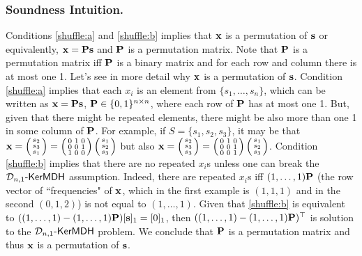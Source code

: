 \subsubsection{Soundness Intuition.} Conditions \ref{shuffle:a} and \ref{shuffle:b} implies that $\mathbf{x}$ is a permutation of $\mathbf{s}$ or equivalently, $\mathbf{{x}}=\mathbf{{P}}\mathbf{s}$ and $\mathbf{{P}}$ is a permutation matrix. Note that $\mathbf{{P}}$ is a permutation matrix iff $\mathbf{{P}}$ is a binary matrix and for each row and column there is at most one 1. Let's see in more detail why $\mathbf{x}$ is a permutation of $\mathbf{s}$. Condition \ref{shuffle:a} implies that each $x_i$ is an element from $\{s_1,\ldots,s_n\}$, which can be written as $\mathbf{x}=\mathbf{{P}}\mathbf{s}$, $\mathbf{{P}}\in\{0,1\}^{n\times n}$, where each row of $\mathbf{{P}}$ has at most one 1. But, given that there might be repeated elements, there might be also more than one 1 in some column of $\mathbf{{P}}$. For example, if $S=\{s_1,s_2,s_3\}$, it may be that $\mathbf{x}=\left(\begin{smallmatrix}s_2\\s_3\\s_1\end{smallmatrix}\right)=\left(\begin{smallmatrix}0&1&0\\0&0&1\\1&0&0\end{smallmatrix}\right)\left(\begin{smallmatrix}s_1\\s_2\\s_3\end{smallmatrix}\right)$ but also $\mathbf{x}=\left(\begin{smallmatrix}s_2\\s_3\\s_3\end{smallmatrix}\right)=\left(\begin{smallmatrix}0&1&0\\0&0&1\\0&0&1\end{smallmatrix}\right)\left(\begin{smallmatrix}s_1\\s_2\\s_3\end{smallmatrix}\right)$. Condition \ref{shuffle:b} implies that there are no repeated $x_i$s unless one can break the $\mathcal{D}_{n,1}\mbox{-}\mathsf{KerMDH}$ assumption. Indeed, there are repeated $x_i$s iff  $(1,\ldots,1)\mathbf{{P}}$ (the row vector of ``frequencies" of $\mathbf{x}$, which in the first example is $(1,1,1)$ and in the second $(0,1,2)$) is not equal to $ (1,\ldots,1)$. Given that \ref{shuffle:b} is equivalent to $((1,\ldots,1)-(1,\ldots,1)\mathbf{{P}})[\mathbf{s}]_1=[0]_1$, then $((1,\ldots,1)-(1,\ldots,1)\mathbf{{P}})^\top$ is solution to the $\mathcal{D}_{n,1}\mbox{-}\mathsf{KerMDH}$ problem. We conclude that $\mathbf{{P}}$ is a permutation matrix and thus $\mathbf{x}$ is a permutation of $\mathbf{s}$.

